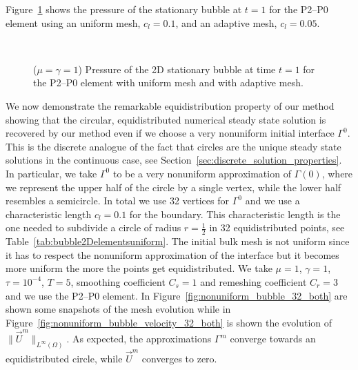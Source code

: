 \documentclass[a4paper,12pt,onecolumn]{article}
\begin{document}
Figure~\ref{fig:2d_stationary_bubble} shows the pressure of the stationary
bubble at $t=1$ for the P2--P0 element using an uniform mesh, $c_l=0.1$, and an
adaptive mesh, $c_l=0.05$.
\begin{figure}[htbp]
  \centering
  \quad
  \\
  \caption{($\mu=\gamma=1$) Pressure of the 2D stationary bubble at time $t=1$
for the P2--P0 element with uniform mesh and with adaptive mesh.}
  \label{fig:2d_stationary_bubble}
\end{figure}

We now demonstrate the remarkable equidistribution property of our method
showing that the circular, equidistributed numerical steady state solution is
recovered by our method even if we choose a very nonuniform initial interface
$\Gamma^0$. This is the discrete analogue of the fact that circles are the
unique steady state solutions in the continuous case, see
Section~\ref{sec:discrete_solution_properties}. In particular, we take
$\Gamma^0$ to be a very nonuniform approximation of $\Gamma(0)$, where we
represent the upper half of the circle by a single vertex, while the lower half
resembles a semicircle. In total we use 32 vertices for $\Gamma^0$ and we use a
characteristic length $c_l=0.1$ for the boundary. This characteristic length is
the one needed to subdivide a circle of radius $r=\frac{1}{2}$ in 32
equidistributed points, see Table~\ref{tab:bubble2Delementsuniform}. The initial
bulk mesh is not uniform since it has to respect the nonuniform approximation of
the interface but it becomes more uniform the more the points get
equidistributed. We take $\mu=1$, $\gamma=1$, $\tau=10^{-4}$, $T=5$, smoothing
coefficient $C_s=1$ and remeshing coefficient $C_r=3$ and we use the P2--P0
element. In Figure~\ref{fig:nonuniform_bubble_32_both} are shown some snapshots
of the mesh evolution while in
Figure~\ref{fig:nonuniform_bubble_velocity_32_both} is shown the evolution of
$\|\vec U^m\|_{L^\infty(\Omega)}$. As expected, the approximations $\Gamma^m$
converge towards an equidistributed circle, while $\vec U^m$ converges to zero.
\end{document}
